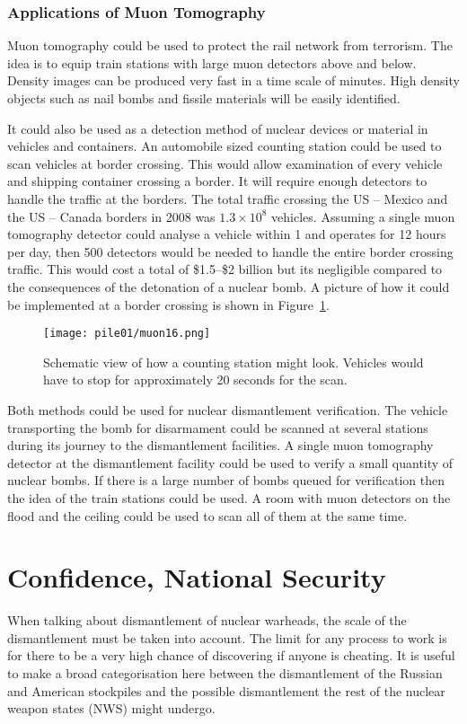 \documentclass[twoside,titlepage,11pt,twocolumn,a4paper]{article}
\begin{document}
\subsubsection{Applications of Muon Tomography}
Muon tomography could be used to protect the rail network from
terrorism. The idea is to equip train stations with large muon
detectors above and below. Density images can be produced very fast in
a time scale of minutes. High density objects such as nail bombs and
fissile materials will be easily identified. \citep{nichol}

It could also be used as a detection method of nuclear devices or
material in vehicles and containers.  An automobile sized counting
station could be used to scan vehicles at border crossing. This would
allow examination of every vehicle and shipping container crossing a
border. It will require enough detectors to handle the traffic at the
borders. The total traffic crossing the US -- Mexico and the US --
Canada borders in 2008 was \(1.3\times10^8\) vehicles. Assuming a
single muon tomography detector could analyse a vehicle within
\unit{1}{\minute} and operates for 12 hours per day, then 500
detectors would be needed to handle the entire border crossing
traffic. This would cost a total of \$1.5--\$2 billion but its
negligible compared to the consequences of the detonation of a nuclear
bomb. A picture of how it could be implemented at a border crossing is
shown in Figure~\ref{fig:muon16}. \citep{morris2008}

\begin{figure}
  \texttt{[image: pile01/muon16.png]}
  \caption{Schematic view of how a counting station might
    look. Vehicles would have to stop for approximately 20 seconds for
    the scan. \citep{morris2008}}
  \label{fig:muon16}
\end{figure}

Both methods could be used for nuclear dismantlement verification. The
vehicle transporting the bomb for disarmament could be scanned at
several stations during its journey to the dismantlement facilities. A
single muon tomography detector at the dismantlement facility could be
used to verify a small quantity of nuclear bombs. If there is a large
number of bombs queued for verification then the idea of the train
stations could be used. A room with muon detectors on the flood and
the ceiling could be used to scan all of them at the same time.

\section{Confidence, National Security}
When talking about dismantlement of nuclear warheads, the scale of the
dismantlement must be taken into account. The limit for any process to
work is for there to be a very high chance of discovering if anyone is
cheating. It is useful to make a broad categorisation here between the
dismantlement of the Russian and American stockpiles and the possible
dismantlement the rest of the nuclear weapon states (NWS) might
undergo.
\end{document}
